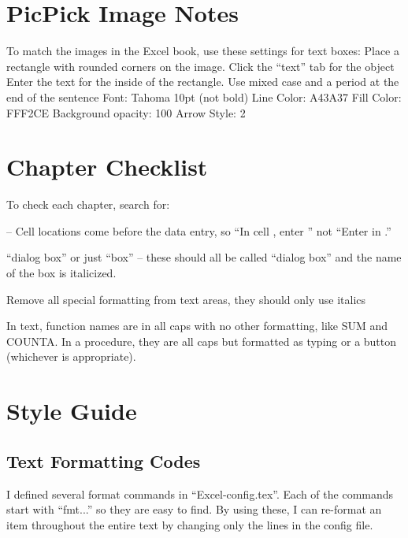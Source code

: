 \begin{enumerate}[resume]
\section{PicPick Image Notes}
To match the images in the Excel book, use these settings for text boxes:
Place a rectangle with rounded corners on the image.
Click the ``text'' tab for the object
Enter the text for the inside of the rectangle. Use mixed case and a period at the end of the sentence
Font: Tahoma 10pt (not bold)
Line Color: A43A37
Fill Color: FFF2CE
Background opacity: 100%
Arrow Style: 2


\section{Chapter Checklist}

To check each chapter, search for:

\fmtLoc -- Cell locations come before the data entry, so ``In cell , enter '' not ``Enter  in .''

``dialog box'' or just ``box'' -- these should all be called ``dialog box'' and the name of the box is italicized. 

Remove all special formatting from text areas, they should only use italics

In text, function names are in all caps with no other formatting, like SUM and COUNTA. In a procedure, they are all caps but formatted as typing or a button (whichever is appropriate).


\section{Style Guide}

\subsection{Text Formatting Codes}
I defined several format commands in ``Excel-config.tex''. Each of the commands start with ``fmt...'' so they are easy to find. By using these, I can re-format an item throughout the entire text by changing only the lines in the config file.


\end{enumerate}
